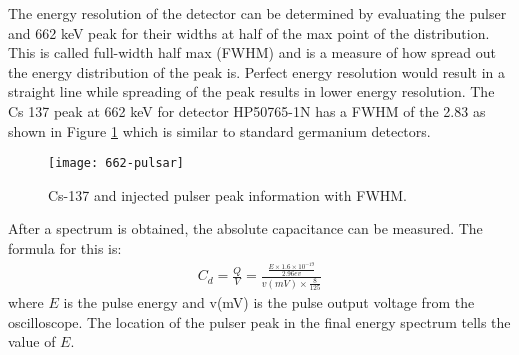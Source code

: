 The energy resolution of the detector can be determined by evaluating the pulser and 662 keV peak for their widths at half of the max point of the distribution.
This is called full-width half max (FWHM) and is a measure of how spread out the energy distribution of the peak is.
Perfect energy resolution would result in a straight line while spreading of the peak results in lower energy resolution.
The Cs 137 peak at 662 keV for detector HP50765-1N has a FWHM of the 2.83 as shown in Figure \ref{fig:662-pulser} which is similar to standard germanium detectors.
\begin{figure}[htpb]
\centering
\texttt{[image: 662-pulsar]}
\caption{Cs-137 and injected pulser peak information with FWHM.}
\label{fig:662-pulser}
\end{figure}

After a spectrum is obtained, the absolute capacitance can be measured.
The formula for this is:
\begin{align*}
C_d=\frac{Q}{V}=\frac{\frac{E\times 1.6\times 10^{-19}}{2.96ev}}{v(mV)\times \frac{8}{125}}
\end{align*}
where $E$ is the pulse energy and v(mV) is the pulse output voltage from the oscilloscope. The location of the pulser peak in the final energy spectrum tells the value of $E$.
